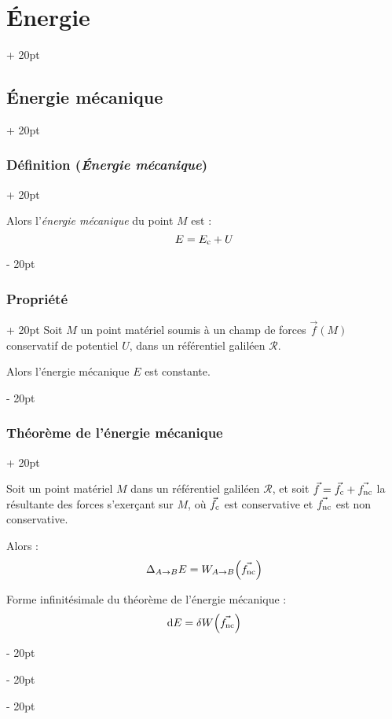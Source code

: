 \documentclass[a4paper, 12pt, twoside]{article}
\newcommand{\lr}[1]{\left( #1 \right)}
\newcommand{\ind}[1][20pt]{\advance\leftskip + #1}
\newcommand{\deind}[1][20pt]{\advance\leftskip - #1}
\newenvironment{indt}[2][20pt]{#2 \par \ind[#1]}{\par \deind} %
\begin{document}
\begin{indt}{\section{\'Energie}}
\begin{indt}{\subsection{Énergie mécanique}}
\begin{indt}{\subsubsection{Définition (\textit{\'Energie mécanique})}}
                \vspace{6pt}
                
                Alors l'\textit{énergie mécanique} du point $M$ est :
                \[
                    E = E_{\rm c} + U
                \]
            \end{indt}

            \vspace{12pt}
            
            \begin{indt}{\subsubsection{Propriété}}
                Soit $M$ un point matériel soumis à un champ de forces $\vec f(M)$ conservatif de potentiel $U$, dans un référentiel galiléen $\mathscr R$.

                \vspace{6pt}
                
                Alors l'énergie mécanique $E$ est constante.
            \end{indt}

            \vspace{12pt}
            
            \begin{indt}{\subsubsection{Théorème de l'énergie mécanique}}
                \label{2.5.3}

                Soit un point matériel $M$ dans un référentiel galiléen $\mathscr R$, et soit $\vec f = \vec{f_{\rm c}} + \vec{f_{\rm nc}}$ la résultante des forces s'exerçant sur $M$, où $\vec{f_{\rm c}}$ est conservative et $\vec{f_{\rm nc}}$ est non conservative.

                \vspace{6pt}
                
                Alors :
                \[
                    \Delta_{A \to B} E = W_{A \to B}\!\lr{\vec{f_{\rm nc}}}
                \]

                \vspace{6pt}
                
                Forme infinitésimale du théorème de l'énergie mécanique :
                \[
                    \mathrm dE = \delta W\!\lr{\vec{f_{\rm nc}}}
                \]
            \end{indt}


\end{indt}
\end{indt}
\end{document}
